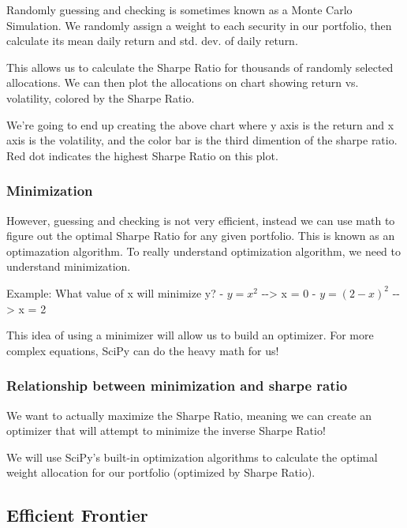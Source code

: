 \documentclass[11pt]{article}
\begin{document}
Randomly guessing and checking is sometimes known as a Monte Carlo
Simulation. We randomly assign a weight to each security in our
portfolio, then calculate its mean daily return and std. dev. of daily
return.

This allows us to calculate the Sharpe Ratio for thousands of randomly
selected allocations. We can then plot the allocations on chart showing
return vs. volatility, colored by the Sharpe Ratio.

We're going to end up creating the above chart where y axis is the
return and x axis is the volatility, and the color bar is the third
dimention of the sharpe ratio. Red dot indicates the highest Sharpe
Ratio on this plot.

    \subsubsection{Minimization}\label{minimization}

However, guessing and checking is not very efficient, instead we can use
math to figure out the optimal Sharpe Ratio for any given portfolio.
This is known as an optimazation algorithm. To really understand
optimization algorithm, we need to understand minimization.

Example: What value of x will minimize y? - \(y = x^2\)
-\/-\textgreater{} x = 0 - \(y = (2 - x) ^2\) -\/-\textgreater{} x = 2

This idea of using a minimizer will allow us to build an optimizer. For
more complex equations, SciPy can do the heavy math for us!

    \subsubsection{Relationship between minimization and sharpe
ratio}\label{relationship-between-minimization-and-sharpe-ratio}

We want to actually maximize the Sharpe Ratio, meaning we can create an
optimizer that will attempt to minimize the inverse Sharpe Ratio!

We will use SciPy's built-in optimization algorithms to calculate the
optimal weight allocation for our portfolio (optimized by Sharpe Ratio).

    \subsection{Efficient Frontier}\label{efficient-frontier}
\end{document}
